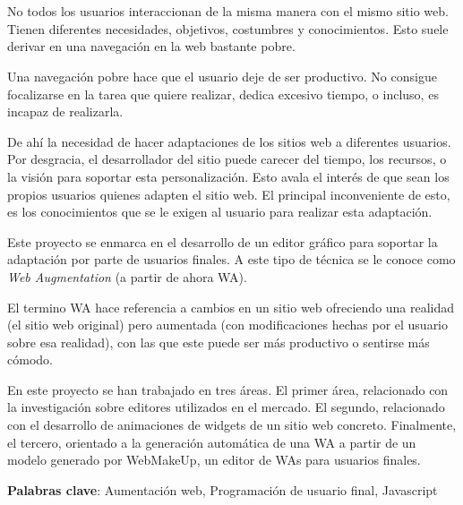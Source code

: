 \chapter*{\abstract}
\setcounter{page}{1}

No todos los usuarios interaccionan de la misma manera con el mismo sitio web. Tienen diferentes necesidades, objetivos, costumbres y conocimientos. Esto suele derivar en una navegación en la web bastante pobre. 

Una navegación pobre hace que el usuario deje de ser productivo. No consigue focalizarse en la tarea que quiere realizar, dedica excesivo tiempo, o incluso, es incapaz de realizarla.

De ahí la necesidad de hacer adaptaciones de los sitios web a diferentes usuarios. Por desgracia, el desarrollador del sitio puede carecer del tiempo, los recursos, o la visión para soportar esta personalización. Esto avala el interés de que sean los propios usuarios quienes adapten el sitio web. El principal inconveniente de esto, es los conocimientos que se le exigen al usuario para realizar esta adaptación.

Este proyecto se enmarca en el desarrollo de un editor gráfico para soportar la adaptación por parte de usuarios finales. A este tipo de técnica se le conoce como \emph{Web Augmentation} (a partir de ahora WA).

El termino WA hace referencia a cambios en un sitio web ofreciendo una realidad (el sitio web original) pero aumentada (con modificaciones hechas por el usuario sobre esa realidad), con las que este puede ser más productivo o sentirse más cómodo.

En este proyecto se han trabajado en tres áreas. El primer área, relacionado con la investigación sobre editores utilizados en el mercado. El segundo, relacionado con el desarrollo de animaciones de widgets de un sitio web concreto. Finalmente, el tercero, orientado a la generación automática de una WA a partir de un modelo generado por WebMakeUp, un editor de WAs para usuarios finales.

\textbf{Palabras clave}: Aumentación web, Programación de usuario final, Javascript